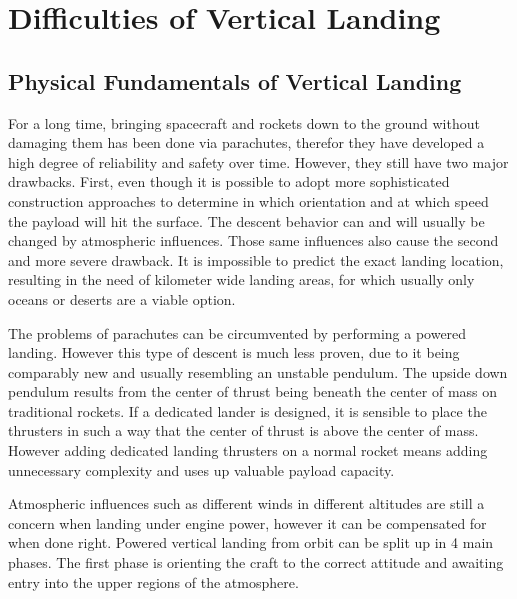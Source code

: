 




\section{Difficulties of Vertical Landing}

\subsection{Physical Fundamentals of Vertical Landing}

For a long time, bringing spacecraft and rockets down to the ground without damaging them has been done via parachutes, therefor they have developed a high degree of reliability and safety over time. However, they still have two major drawbacks. First, even though it is possible to adopt more sophisticated construction approaches to determine in which orientation and at which speed the payload will hit the surface. The descent behavior can and will usually be changed by atmospheric influences. Those same influences also cause the second and more severe drawback. It is impossible to predict the exact landing location, resulting in the need of kilometer wide landing areas, for which usually only oceans or deserts are a viable option.

The problems of parachutes can be circumvented by performing a powered landing. However this type of descent is much less proven, due to it being comparably new and usually resembling an unstable pendulum. The upside down pendulum results from the center of thrust being beneath the center of mass on traditional rockets. If a dedicated lander is designed, it is sensible to place the thrusters in such a way that the center of thrust is above the center of mass. However adding dedicated landing thrusters on a normal rocket means adding unnecessary complexity and uses up valuable payload capacity.

Atmospheric influences such as different winds in different altitudes are still a concern when landing under engine power, however it can be compensated for when done right. Powered vertical landing from orbit can be split up in 4 main phases. The first phase is orienting the craft to the correct attitude and awaiting entry into the upper regions of the atmosphere. 

